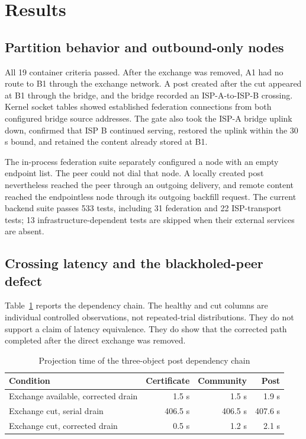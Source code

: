 \documentclass[conference,a4paper]{IEEEtran}
\begin{document}
\section{Results}

\subsection{Partition behavior and outbound-only nodes}

All 19 container criteria passed. After the exchange was removed, A1 had no route to B1 through the
exchange network. A post created after the cut appeared at B1 through the bridge, and the bridge
recorded an ISP-A-to-ISP-B crossing. Kernel socket tables showed established federation connections
from both configured bridge source addresses. The gate also took the ISP-A bridge uplink down,
confirmed that ISP B continued serving, restored the uplink within the 30 s bound, and retained the
content already stored at B1.

The in-process federation suite separately configured a node with an empty endpoint list. The peer
could not dial that node. A locally created post nevertheless reached the peer through an outgoing
delivery, and remote content reached the endpointless node through its outgoing backfill request.
The current backend suite passes 533 tests, including 31 federation and 22 ISP-transport tests; 13
infrastructure-dependent tests are skipped when their external services are absent.

\subsection{Crossing latency and the blackholed-peer defect}

Table~\ref{tab:crossing} reports the dependency chain. The healthy and cut columns are individual
controlled observations, not repeated-trial distributions. They do not support a claim of latency
equivalence. They do show that the corrected path completed after the direct exchange was removed.

\begin{table}[t]
\caption{Projection time of the three-object post dependency chain}
\label{tab:crossing}
\centering
\scriptsize
\begin{tabular}{lrrr}
\toprule
\textbf{Condition} & \textbf{Certificate} & \textbf{Community} & \textbf{Post} \\
\midrule
Exchange available, corrected drain & 1.5 s & 1.5 s & 1.9 s \\
Exchange cut, serial drain & 406.5 s & 406.5 s & 407.6 s \\
Exchange cut, corrected drain & 0.5 s & 1.2 s & 2.1 s \\
\bottomrule
\end{tabular}
\end{table}
\end{document}
